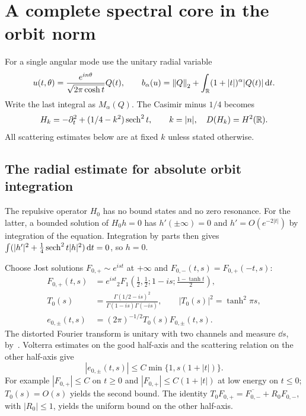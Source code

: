 \section{A complete spectral core in the orbit norm}
\label{sec:spectral}
For a single angular mode use the unitary radial variable
\begin{equation}
 u(t,\theta)=\frac{e^{in\theta}}{\sqrt{2\pi\cosh t}}Q(t),\qquad
 b_\alpha(u)=\left\lVert Q\right\rVert_2+
 \int_{\mathbb R}(1+|t|)^\alpha|Q(t)|\mathop{}\!\mathrm d t.
 \label{eq:fractional-norm}
\end{equation}
Write the last integral as $M_\alpha(Q)$. The Casimir minus $1/4$ becomes
\begin{equation}
 H_k=-\partial_t^2+(1/4-k^2)\operatorname{sech}^2t,\qquad
 k=|n|,\quad D(H_k)=H^2(\mathbb R).
\end{equation}
All scattering estimates below are at fixed $k$ unless stated otherwise.

\subsection{The radial estimate for absolute orbit integration}
The repulsive operator $H_0$ has no bound states and no zero resonance.
For the latter, a bounded solution of $H_0h=0$ has
$h'(\pm\infty)=0$ and $h'=O(e^{-2|t|})$ by integration of the equation.
Integration by parts then gives
$\int(|h'|^2+\tfrac14\operatorname{sech}^2t|h|^2)\mathop{}\!\mathrm d t=0$, so $h=0$.

Choose Jost solutions $F_{0,+}\sim e^{ist}$ at $+\infty$ and
$F_{0,-}(t,s)=F_{0,+}(-t,s)$:
\begin{align}
 F_{0,+}(t,s)&=e^{ist}{}_2F_1\left(\tfrac12,\tfrac12;1-is;
                         \tfrac{1-\tanh t}{2}\right),\\
 T_0(s)&=\frac{\Gamma(1/2-is)^2}{\Gamma(1-is)\Gamma(-is)},
 \qquad |T_0(s)|^2=\tanh^2\pi s,\\
 e_{0,\pm}(t,s)&=(2\pi)^{-1/2}T_0(s)F_{0,\pm}(t,s).
\end{align}
The distorted Fourier transform is unitary with two channels and measure
$\dd s$, by~\cite[Theorem 2.3]{GPR}. Volterra estimates on the good
half-axis and the scattering relation on the other half-axis give
\begin{equation}
 |e_{0,\pm}(t,s)|\le C\min\{1,s(1+|t|)\}.
 \label{eq:threshold-bound}
\end{equation}
For example $|F_{0,+}|\le C$ on $t\ge0$ and
$|F_{0,+}|\le C(1+|t|)$ at low energy on $t\le0$;
$T_0(s)=O(s)$ yields the second bound. The identity
$T_0F_{0,+}=\overline{F_{0,-}}+R_0F_{0,-}$, with $|R_0|\le1$,
yields the uniform bound on the other half-axis.

